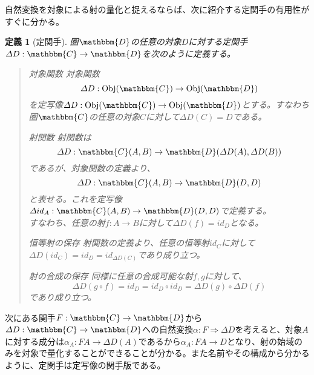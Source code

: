 \documentclass[uplatex,dvipdfmx]{jsarticle}
\newcommand{\cat}[1]{\mathbbm{#1}}
\newcommand{\arrow}{\rightarrow}
\newcommand{\functor}[3]{#1:\cat{#2}\arrow \cat{#3}}
\newcommand{\nat}[3]{#1:#2\Rightarrow #3}
\newcommand{\obj}[1]{\mathrm{Obj}(\cat{#1})}
\newcommand{\mor}[3]{#1:#2\arrow #3}
\newcommand{\arset}[3]{\cat{#1}(#2,#3)}
\newtheorem{define}[proof]{定義}
\numberwithin{proof}{subsection}
\newenvironment{mydescription}
{\begin{description}
  \setlength{\parskip}{0.5cm}
}
{\end{description}}
\begin{document}
  自然変換を対象による射の量化と捉えるならば、次に紹介する定関手の有用性がすぐに分かる。
  \begin{define}[定関手]
    圏$\cat{D}$の任意の対象$D$に対する定関手$\functor{\varDelta D}{C}{D}$を次のように定義する。
    \begin{quote}
			\begin{mydescription}
				\item[対象関数] 対象関数\[\mor{\varDelta D}{\obj{C}}{\obj{D}}\]
				を定写像$\mor{\varDelta D}{\obj{C}}{\obj{D}}$とする。すなわち圏$\cat{C}$の任意の対象$C$に対して$\varDelta D(C)=D$である。
				\item[射関数] 
        射関数は\[\mor{\varDelta D}{\arset{C}{A}{B}}{\arset{D}{\varDelta D(A)}{\varDelta D(B)}}\]であるが、対象関数の定義より、\[\mor{\varDelta D}{\arset{C}{A}{B}}{\arset{D}{D}{D}}\]と表せる。これを定写像$\mor{\varDelta id_A}{\arset{C}{A}{B}}{\arset{D}{D}{D}}$で定義する。\\
        すなわち、任意の射$\mor{f}{A}{B}$に対して$\varDelta D (f)=id_D$となる。
				\item[恒等射の保存] 射関数の定義より、任意の恒等射$id_C$に対して$\varDelta D (id_C)=id_D=id_{\varDelta D(C)}$であり成り立つ。
				\item[射の合成の保存] 同様に任意の合成可能な射$f,g$に対して、\[\varDelta D (g\circ f)=id_D=id_D\circ id_D=\varDelta D (g)\circ \varDelta D (f)\]であり成り立つ。
			\end{mydescription}
		\end{quote}
    \begin{center}
    \end{center}
  \end{define}
  次にある関手$\functor{F}{C}{D}$から$\functor{\varDelta D}{C}{D}$への自然変換$\nat{\alpha}{F}{\varDelta D}$を考えると、対象$A$に対する成分は$\mor{\alpha_A}{FA}{\varDelta D(A)}$であるから$\mor{\alpha_A}{FA}{D}$となり、射の始域のみを対象で量化することができることが分かる。また名前やその構成から分かるように、定関手は定写像の関手版である。
\end{document}
